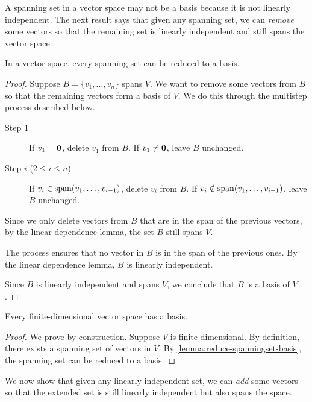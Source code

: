 A spanning set in a vector space may not be a basis because it is not linearly independent. The next result says that given any spanning set, we can \emph{remove} some vectors so that the remaining set is linearly independent and still spans the vector space.

\begin{lemma}\label{lemma:reduce-spanningset-basis}
In a vector space, every spanning set can be reduced to a basis.
\end{lemma}

\begin{proof}
Suppose $B=\{v_1,\dots,v_n\}$ spans $V$. We want to remove some vectors from $B$ so that the remaining vectors form a basis of $V$. We do this through the multistep process described below.

\begin{description}
\item[Step 1] If $v_1=\vb{0}$, delete $v_1$ from $B$. If $v_1\neq\vb{0}$, leave $B$ unchanged.
\item[Step $i$ ($2\le i\le n$)] If $v_i\in\operatorname{span}(v_1,\dots,v_{i-1})$, delete $v_i$ from $B$. If $v_i\notin\operatorname{span}(v_1,\dots,v_{i-1})$, leave $B$ unchanged.
\end{description}

Since we only delete vectors from $B$ that are in the span of the previous vectors, by the linear dependence lemma, the set $B$ still spans $V$.

The process ensures that no vector in $B$ is in the span of the previous ones. By the linear dependence lemma, $B$ is linearly independent.

Since $B$ is linearly independent and spans $V$, we conclude that $B$ is a basis of $V$.
\end{proof}

\begin{corollary}\label{cor:basis-fin-dim}
Every finite-dimensional vector space has a basis.
\end{corollary}

\begin{proof}
We prove by construction. Suppose $V$ is finite-dimensional. By definition, there exists a spanning set of vectors in $V$. By \ref{lemma:reduce-spanningset-basis}, the spanning set can be reduced to a basis.
\end{proof}

We now show that given any linearly independent set, we can \emph{add} some vectors so that the extended set is still linearly independent but also spans the space.

